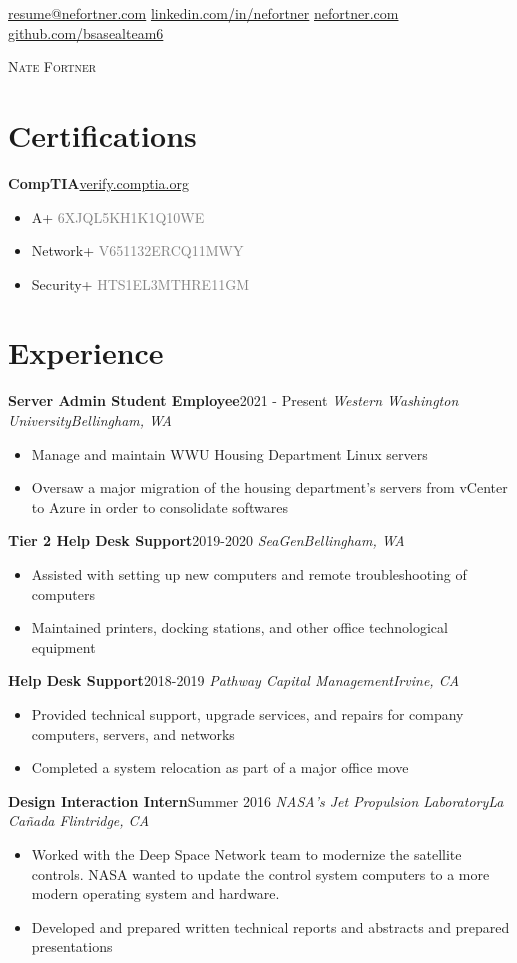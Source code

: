 \documentclass{article}
\newcommand{\alignicon}[2][nmbr]{\eqmakebox[#1]{\strut #2}}
\newcommand{\topLevelItem}[4]{
    \textbf{#1}\hfill #4\newline
    \emph{#2\hfill #3}\newline
    \vspace{-18pt}\begin{itemize}
}
\newcommand{\certificationType}[2]{
    \textbf{#1}\hfill #2\newline
    \vspace{-18pt}\begin{itemize}
}
\newcommand{\topLevelItemEnd}{\end{itemize}\vspace{5pt}}
\newcommand{\certificationTypeEnd}{\end{itemize}\vspace{5pt}}
\newcommand{\lowLevelItem}[1]{
    \item\small{#1}\vspace{-8pt}
}
\newcommand{\certification}[2]{
    \lowLevelItem{#1 \hfill \textcolor{gray}{#2}}
}
\begin{document}
    \begin{center}
        \noindent\alignicon\faEnvelope\quad\href{mailto:resume@nefortner.com}{resume@nefortner.com}\hfill %
        \href{https://linkedin.com/in/nefortner}{linkedin.com/in/nefortner}\quad\alignicon\faLinkedin\newline %
        \alignicon\faGlobe\quad\href{https://nefortner.com}{nefortner.com}\hfill %
        \href{https://github.com/bsasealteam6}{github.com/bsasealteam6}\quad\alignicon\faGithub\vspace*{-0.33in} %
        
        {\fontsize{28}{0}\selectfont\scshape Nate Fortner}\vspace{5pt}
    \end{center}
    \section*{Certifications}
        \certificationType{CompTIA}{\href{https://verify.comptia.org}{verify.comptia.org}}
            \certification{A+}{6XJQL5KH1K1Q10WE}
            \certification{Network+}{V651132ERCQ11MWY}
            \certification{Security+}{HTS1EL3MTHRE11GM}
        \certificationTypeEnd
    \section*{Experience}
        \topLevelItem{Server Admin Student Employee}{Western Washington University}{Bellingham, WA}{2021 - Present}
            \lowLevelItem{Manage and maintain WWU Housing Department Linux servers}
            \lowLevelItem{Oversaw a major migration of the housing department’s servers from vCenter to Azure in order to consolidate softwares}
        \topLevelItemEnd
        \topLevelItem{Tier 2 Help Desk Support}{SeaGen}{Bellingham, WA}{2019-2020}
            \lowLevelItem{Assisted with setting up new computers and remote troubleshooting of computers}
            \lowLevelItem{Maintained printers, docking stations, and other office technological equipment}
        \topLevelItemEnd
        \topLevelItem{Help Desk Support}{Pathway Capital Management}{Irvine, CA}{2018-2019}
            \lowLevelItem{Provided technical support, upgrade services, and repairs for company computers, servers, and networks}
            \lowLevelItem{Completed a system relocation as part of a major office move}
        \topLevelItemEnd
        \topLevelItem{Design Interaction Intern}{NASA's Jet Propulsion Laboratory}{La Ca\~{n}ada Flintridge, CA}{Summer 2016}
            \lowLevelItem{Worked with the Deep Space Network team to modernize the satellite controls. NASA wanted to update the control system computers to a more modern operating system and hardware.}
            \lowLevelItem{Developed and prepared written technical reports and abstracts and prepared presentations}
        \topLevelItemEnd
\end{document}
